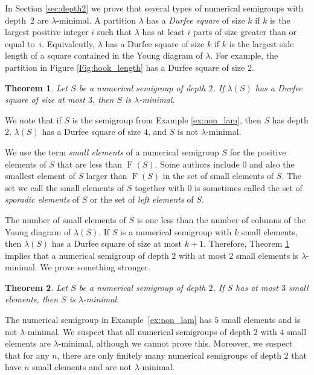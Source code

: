 \documentclass{amsproc}
\DeclareMathOperator{\F}{F}
\newtheorem{theorem}{Theorem}[section]
\theoremstyle{definition}
\theoremstyle{remark}
\numberwithin{equation}{section}
\begin{document}
 In Section \ref{sec:depth2} we prove that several types of numerical semigroups with depth~$2$ are $\lambda$-minimal. A partition $\lambda$ has a \emph{Durfee square} of size $k$ if $k$ is the largest positive integer $i$ such that $\lambda$ has at least $i$ parts of size greater than or equal to~$i$.  Equivalently, $\lambda$ has a Durfee square of size $k$ if $k$ is the largest side length of a square contained in the Young diagram of $\lambda$.  For example, the partition in Figure \ref{Fig:hook_length} has a Durfee square of size $2$.
\begin{theorem}\label{thm:Durfee}
Let $S$ be a numerical semigroup of depth $2$.  If $\lambda(S)$ has a Durfee square of size at most $3$, then $S$ is $\lambda$-minimal.
\end{theorem}
We note that if $S$ is the semigroup from Example \ref{ex:non_lam}, then $S$ has depth $2$, $\lambda(S)$ has a Durfee square of size $4$, and $S$ is not $\lambda$-minimal.

We use the term \emph{small elements} of a numerical semigroup $S$ for the positive elements of $S$ that are less than $\F(S)$. Some authors include $0$ and also the smallest element of $S$ larger than $\F(S)$ in the set of small elements of $S$.  The set we call the small elements of $S$ together with $0$ is sometimes called the set of \emph{sporadic elements} of $S$ or the set of \emph{left elements} of $S$.

The number of small elements of $S$ is one less than the number of columns of the Young diagram of $\lambda(S)$.
If $S$ is a numerical semigroup with $k$ small elements, then $\lambda(S)$ has a Durfee square of size at most $k+1$. Therefore, Theorem \ref{thm:Durfee} implies that a numerical semigroup of depth $2$ with at most $2$ small elements is $\lambda$-minimal.  We prove something stronger.

\begin{theorem}\label{thm:small_elements}
Let $S$ be a numerical semigroup of depth $2$.  If $S$ has at most $3$ small elements, then $S$ is $\lambda$-minimal.
\end{theorem} 
The numerical semigroup in Example~\ref{ex:non_lam} has $5$ small elements and is not $\lambda$-minimal.
We suspect that all numerical semigroups of depth $2$ with $4$ small elements are $\lambda$-minimal, although we cannot prove this. Moreover, we suspect that for any $n$, there are only finitely many numerical semigroups of depth $2$ that have $n$ small elements and are not $\lambda$-minimal.
\end{document}
